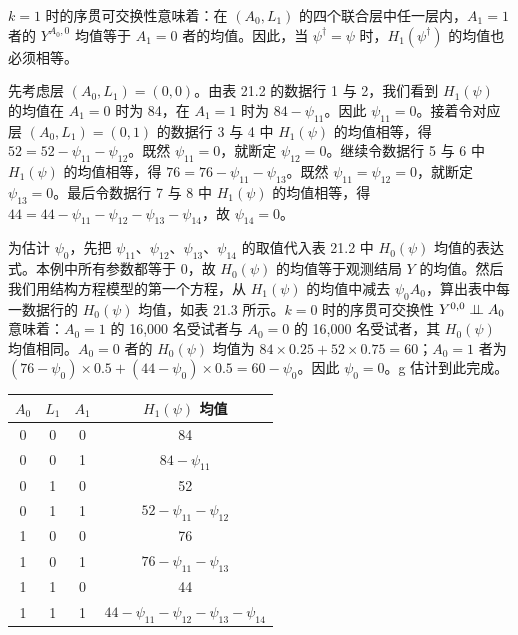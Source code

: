 \renewcommand{\FPname}{精要（Fine Point）}
\begin{finepoint}[用饱和结构嵌套模型做 g 估计]
$k=1$ 时的序贯可交换性意味着：在 $(A_0,L_1)$ 的四个联合层中任一层内，$A_1=1$ 者的 $Y^{A_0,0}$ 均值等于 $A_1=0$ 者的均值。因此，当 $\psi^\dagger=\psi$ 时，$H_1(\psi^\dagger)$ 的均值也必须相等。

先考虑层 $(A_0,L_1)=(0,0)$。由表 21.2 的数据行 1 与 2，我们看到 $H_1(\psi)$ 的均值在 $A_1=0$ 时为 84，在 $A_1=1$ 时为 $84-\psi_{11}$。因此 $\psi_{11}=0$。接着令对应层 $(A_0,L_1)=(0,1)$ 的数据行 3 与 4 中 $H_1(\psi)$ 的均值相等，得 $52=52-\psi_{11}-\psi_{12}$。既然 $\psi_{11}=0$，就断定 $\psi_{12}=0$。继续令数据行 5 与 6 中 $H_1(\psi)$ 的均值相等，得 $76=76-\psi_{11}-\psi_{13}$。既然 $\psi_{11}=\psi_{12}=0$，就断定 $\psi_{13}=0$。最后令数据行 7 与 8 中 $H_1(\psi)$ 的均值相等，得 $44=44-\psi_{11}-\psi_{12}-\psi_{13}-\psi_{14}$，故 $\psi_{14}=0$。

为估计 $\psi_0$，先把 $\psi_{11}$、$\psi_{12}$、$\psi_{13}$、$\psi_{14}$ 的取值代入表 21.2 中 $H_0(\psi)$ 均值的表达式。本例中所有参数都等于 0，故 $H_0(\psi)$ 的均值等于观测结局 $Y$ 的均值。然后我们用结构方程模型的第一个方程，从 $H_1(\psi)$ 的均值中减去 $\psi_0A_0$，算出表中每一数据行的 $H_0(\psi)$ 均值，如表 21.3 所示。$k=0$ 时的序贯可交换性 $Y^{0,0}\perp\!\!\!\perp A_0$ 意味着：$A_0=1$ 的 16{,}000 名受试者与 $A_0=0$ 的 16{,}000 名受试者，其 $H_0(\psi)$ 均值相同。$A_0=0$ 者的 $H_0(\psi)$ 均值为 $84\times0.25+52\times0.75=60$；$A_0=1$ 者为 $(76-\psi_0)\times0.5+(44-\psi_0)\times0.5=60-\psi_0$。因此 $\psi_0=0$。g 估计到此完成。

\begin{center}
\begin{minipage}{0.92\textwidth}
\centering
{}
\label{tab:21.2}
\small
\begin{tabular}{cccc}
\toprule
$A_0$ & $L_1$ & $A_1$ & $H_1(\psi)$ 均值\\
\midrule
0 & 0 & 0 & 84\\
0 & 0 & 1 & $84-\psi_{11}$\\
0 & 1 & 0 & 52\\
0 & 1 & 1 & $52-\psi_{11}-\psi_{12}$\\
1 & 0 & 0 & 76\\
1 & 0 & 1 & $76-\psi_{11}-\psi_{13}$\\
1 & 1 & 0 & 44\\
1 & 1 & 1 & $44-\psi_{11}-\psi_{12}-\psi_{13}-\psi_{14}$\\
\bottomrule
\end{tabular}


\end{minipage}
\end{center}
\end{finepoint}
